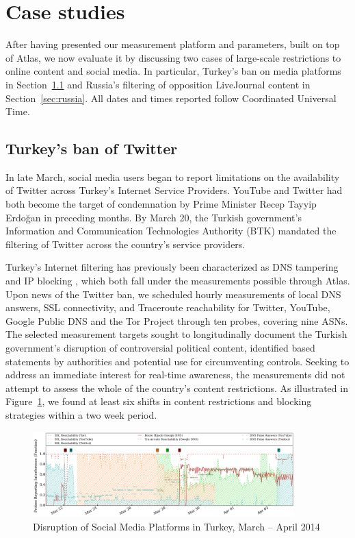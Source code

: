 \section{Case studies}
\label{sec:case_studies}

After having presented our measurement platform and parameters, built on
top of Atlas, we now evaluate it by discussing two cases of large-scale
restrictions to online content and social media.  In particular,
Turkey's ban on media platforms in Section~\ref{sec:turkey} and Russia's
filtering of opposition LiveJournal content in Section~\ref{sec:russia}.
All dates and times reported follow Coordinated Universal Time.


\subsection{Turkey's ban of Twitter}
\label{sec:turkey}

In late March, social media users began to report limitations on the
availability of Twitter across Turkey's Internet Service Providers.
YouTube and Twitter had both become the target of condemnation by Prime
Minister Recep Tayyip Erdo\u{g}an in preceding months. By March 20, the
Turkish government's Information and Communication Technologies
Authority (BTK) mandated the filtering of Twitter across the country's
service providers.

Turkey's Internet filtering has previously been characterized as DNS
tampering and IP blocking \cite{akdeniz2010report}, which both fall
under the measurements possible through Atlas.  Upon news of the Twitter
ban, we scheduled hourly measurements of local DNS answers, SSL
connectivity, and Traceroute reachability for Twitter, YouTube, Google
Public DNS and the Tor Project through ten probes, covering nine ASNs. 
The selected measurement targets sought to longitudinally document the
Turkish government's disruption of controversial political content,
identified based statements by authorities and potential use for
circumventing controls. Seeking to address an immediate interest for
real-time awareness, the measurements did not attempt to assess the
whole of the country's content restrictions. As illustrated in
Figure~\ref{image:tr-social_media_filtering}, we found at least six
shifts in content restrictions and blocking strategies within a two week
period.

\begin{figure}
  \centering
  \includegraphics[width=0.9\textwidth]{diagrams/tr-20140321-20140407-social_media_filtering.png}
  \caption{Disruption of Social Media Platforms in Turkey, March -- April 2014}
  \label{image:tr-social_media_filtering}
\end{figure}


